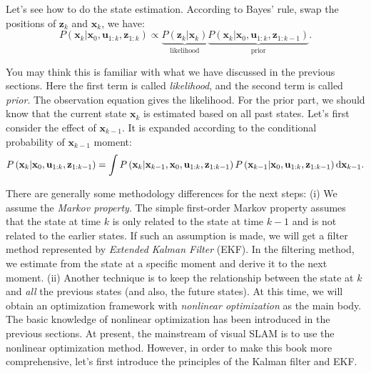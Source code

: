 Let's see how to do the state estimation. According to Bayes' rule, swap the positions of $\mathbf{z}_k$ and $\mathbf{x}_k$, we have:
\begin{equation}
	\label{eq:10-5}
	P\left( {{\mathbf{x}_k}|{\mathbf{x}_0},{\mathbf{u}_{1:k}},{\mathbf{z}_{1:k}}} \right) \propto \underbrace{P\left( {{\mathbf{z}_k}|{\mathbf{x}_k}} \right)}_{\text{likelihood}} \underbrace{P\left( {{\mathbf{x}_k}|{\mathbf{x}_0},{\mathbf{u}_{1:k}},{\mathbf{z}_{1:k - 1}}} \right)}_{\text{prior}}.
\end{equation}

You may think this is familiar with what we have discussed in the previous sections. Here the first term is called \textit{likelihood}, and the second term is called \textit{prior}. The observation equation gives the likelihood. For the prior part, we should know that the current state $\mathbf{x}_k$ is estimated based on all past states. Let's first consider the effect of $\mathbf{x}_{k-1}$. It is expanded according to the conditional probability of $\mathbf{x}_{k-1}$ moment:
\begin{equation}
	\label{eq:bayes-estimator}
	\small
	P\left( {{\mathbf{x}_k}|{\mathbf{x}_0},{\mathbf{u}_{1:k}},{\mathbf{z}_{1:k - 1}}} \right) = \int {P\left( {{\mathbf{x}_k}|{\mathbf{x}_{k - 1}},{\mathbf{x}_0},{\mathbf{u}_{1:k}},{\mathbf{z}_{1:k - 1}}} \right)P\left( {{\mathbf{x}_{k - 1}}|{\mathbf{x}_0},{\mathbf{u}_{1:k}},{\mathbf{z}_{1:k - 1}}} \right) \mathrm{d}\mathbf{x}_{k-1} }.
\end{equation}

There are generally some methodology differences for the next steps: (i) We assume the \textit{Markov property}. The simple first-order Markov property assumes that the state at time $k$ is only related to the state at time $k-1$ and is not related to the earlier states. If such an assumption is made, we will get a filter method represented by \textit{Extended Kalman Filter} (EKF). In the filtering method, we estimate from the state at a specific moment and derive it to the next moment. (ii) Another technique is to keep the relationship between the state at $k$ and \textit{all} the previous states (and also, the future states). At this time, we will obtain an optimization framework with \textit{nonlinear optimization} as the main body. The basic knowledge of nonlinear optimization has been introduced in the previous sections. At present, the mainstream of visual SLAM is to use the nonlinear optimization method. However, in order to make this book more comprehensive, let's first introduce the principles of the Kalman filter and EKF.

